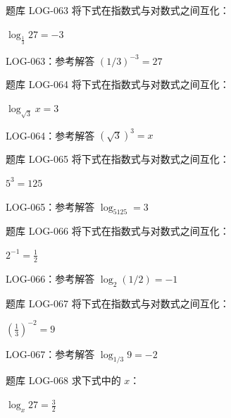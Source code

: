 \documentclass[aspectratio=169,10pt]{beamer}
\begin{document}
\begin{campuspractice}{题库 LOG-063}
将下式在指数式与对数式之间互化：\par
$\log_{\frac{1}{3}}27=-3$
\end{campuspractice}

\ifdefined\TeacherEdition
\begin{frame}[t]{LOG-063：参考解答}
$(1/3)^{-3}=27$
\end{frame}
\fi

\begin{campuspractice}{题库 LOG-064}
将下式在指数式与对数式之间互化：\par
$\log_{\sqrt3}x=3$
\end{campuspractice}

\ifdefined\TeacherEdition
\begin{frame}[t]{LOG-064：参考解答}
$(\sqrt3)^3=x$
\end{frame}
\fi

\begin{campuspractice}{题库 LOG-065}
将下式在指数式与对数式之间互化：\par
$5^3=125$
\end{campuspractice}

\ifdefined\TeacherEdition
\begin{frame}[t]{LOG-065：参考解答}
$\log_5125=3$
\end{frame}
\fi

\begin{campuspractice}{题库 LOG-066}
将下式在指数式与对数式之间互化：\par
$2^{-1}=\frac{1}{2}$
\end{campuspractice}

\ifdefined\TeacherEdition
\begin{frame}[t]{LOG-066：参考解答}
$\log_2(1/2)=-1$
\end{frame}
\fi

\begin{campuspractice}{题库 LOG-067}
将下式在指数式与对数式之间互化：\par
$(\frac{1}{3})^{-2}=9$
\end{campuspractice}

\ifdefined\TeacherEdition
\begin{frame}[t]{LOG-067：参考解答}
$\log_{1/3}9=-2$
\end{frame}
\fi

\begin{campuspractice}{题库 LOG-068}
求下式中的 $x$：\par
$\log_x27=\frac{3}{2}$
\end{campuspractice}
\end{document}
